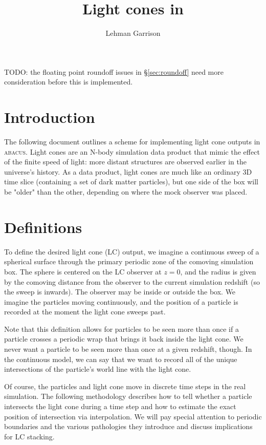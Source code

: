\documentclass[a4paper]{article}
\title{Light cones in \abacus}
\author{Lehman Garrison}
\newcommand{\abacus}{\textsc{abacus}\xspace}
\begin{document}
\maketitle

TODO: the floating point roundoff issues in \S\ref{sec:roundoff} need more consideration before this is implemented.

\section{Introduction}
The following document outlines a scheme for implementing light cone outputs in \abacus.  Light cones are an N-body simulation data product that mimic the effect of the finite speed of light: more distant structures are observed earlier in the universe's history.  As a data product, light cones are much like an ordinary 3D time slice (containing a set of dark matter particles), but one side of the box will be "older" than the other, depending on where the mock observer was placed.

\section{Definitions}
To define the desired light cone (LC) output, we imagine a continuous sweep of a spherical surface through the primary periodic zone of the comoving simulation box.  The sphere is centered on the LC observer at $z=0$, and the radius is given by the comoving distance from the observer to the current simulation redshift (so the sweep is inwards).  The observer may be inside or outside the box.  We imagine the particles moving continuously, and the position of a particle is recorded at the moment the light cone sweeps past.

Note that this definition allows for particles to be seen more than once if a particle crosses a periodic wrap that brings it back inside the light cone.  We never want a particle to be seen more than once at a given redshift, though.  In the continuous model, we can say that we want to record all of the unique intersections of the particle's world line with the light cone.

Of course, the particles and light cone move in discrete time steps in the real simulation.  The following methodology describes how to tell whether a particle intersects the light cone during a time step and how to estimate the exact position of intersection via interpolation.  We will pay special attention to periodic boundaries and the various pathologies they introduce and discuss implications for LC stacking.
\end{document}
